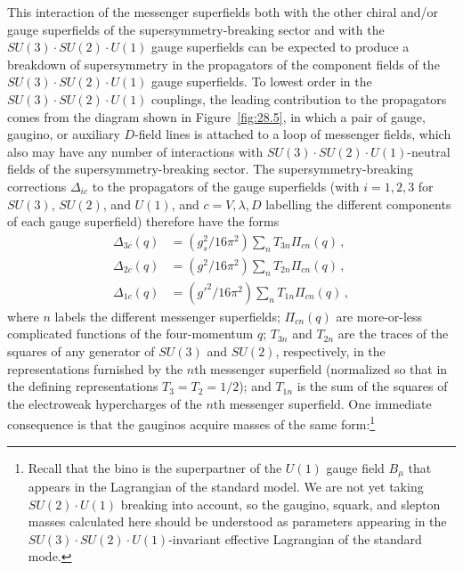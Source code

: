 This interaction of the messenger superfields both with the other chiral
and/or gauge superfields of the supersymmetry-breaking sector and with the
\(SU(3)\mathbin{\cdot}SU(2)\mathbin{\cdot}U(1)\) gauge superfields can be
expected to produce a breakdown of supersymmetry in the propagators of the
component fields of the
\(SU(3)\mathbin{\cdot}SU(2)\mathbin{\cdot}U(1)\) gauge superfields. To
lowest order in the \(SU(3)\mathbin{\cdot}SU(2)\mathbin{\cdot}U(1)\)
couplings, the leading contribution to the propagators comes from the
diagram shown in Figure~\ref{fig:28.5}, in which a pair of gauge, gaugino,
or auxiliary \(D\)-field lines is attached to a loop of messenger fields,
which also may have any number of interactions with
\(SU(3)\mathbin{\cdot}SU(2)\mathbin{\cdot}U(1)\)-neutral fields of the
supersymmetry-breaking sector. The supersymmetry-breaking corrections
\(\Delta_{ic}\) to the propagators of the gauge superfields (with
\(i=1,2,3\) for \(SU(3)\), \(SU(2)\), and \(U(1)\), and
\(c=V,\lambda,D\) labelling the different components of each gauge
superfield) therefore have the forms
\begin{equation}
  \begin{aligned}
    \Delta_{3c}(q)
      &=(g_s^2/16\pi^2)\sum_n T_{3n}\Pi_{cn}(q)\,,\\
    \Delta_{2c}(q)
      &=(g^2/16\pi^2)\sum_n T_{2n}\Pi_{cn}(q)\,,\\
    \Delta_{1c}(q)
      &=(g'^2/16\pi^2)\sum_n T_{1n}\Pi_{cn}(q)\,,
  \end{aligned}
  \tag{28.6.1}\label{eq:28.6.1}
\end{equation}
where \(n\) labels the different messenger superfields; \(\Pi_{cn}(q)\)
are more-or-less complicated functions of the four-momentum \(q\);
\(T_{3n}\) and \(T_{2n}\) are the traces of the squares of any generator of
\(SU(3)\) and \(SU(2)\), respectively, in the representations furnished by
the \(n\)th messenger superfield (normalized so that in the defining
representations \(T_3=T_2=1/2\)); and \(T_{1n}\) is the sum of the squares
of the electroweak hypercharges of the \(n\)th messenger superfield. One
immediate consequence is that the gauginos acquire masses of the same
form:\footnote{Recall that the bino is the superpartner of the \(U(1)\)
gauge field \(B_\mu\) that appears in the Lagrangian of the standard model.
We are not yet taking \(SU(2)\mathbin{\cdot}U(1)\) breaking into account,
so the gaugino, squark, and slepton masses calculated here should be
understood as parameters appearing in the
\(SU(3)\mathbin{\cdot}SU(2)\mathbin{\cdot}U(1)\)-invariant effective
Lagrangian of the standard mode.}
